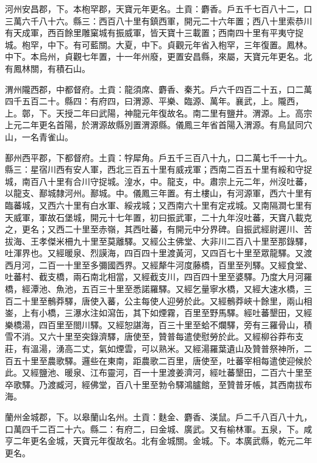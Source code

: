 \begin{pinyinscope}
 河州安昌郡，下。本枹罕郡，天寶元年更名。土貢：麝香。戶五千七百八十二，口三萬六千八十六。縣三：西百八十里有鎮西軍，開元二十六年置；西八十里索恭川有天成軍，西百餘里雕窠城有振威軍，皆天寶十三載置；西南四十里有平夷守捉城。枹罕，中下。有可藍關。大夏，中下。貞觀元年省入枹罕，三年復置。鳳林。中下。本烏州，貞觀七年置，十一年州廢，更置安昌縣，來屬，天寶元年更名。北有鳳林關，有積石山。



 渭州隴西郡，中都督府。土貢：龍須席、麝香、秦艽。戶六千四百二十五，口二萬四千五百二十。縣四：有府四，曰渭源、平樂、臨源、萬年。襄武，上。隴西，上。鄣，下。天授二年曰武陽，神龍元年復故名。南二里有鹽井。渭源。上。高宗上元二年更名首陽，於渭源故縣別置渭源縣。儀鳳三年省首陽入渭源。有鳥鼠同穴山，一名青雀山。



 鄯州西平郡，下都督府。土貢：牸犀角。戶五千三百八十九，口二萬七千一十九。縣三：星宿川西有安人軍，西北三百五十里有威戎軍；西南二百五十里有綏和守捉城，南百八十里有合川守捉城。湟水，中。龍支，中。肅宗上元二年，州沒吐蕃，以龍支、鄯城隸河州。鄯城。中。儀鳳三年置。有土樓山，有河源軍，西六十里有臨蕃城，又西六十里有白水軍、綏戎城；又西南六十里有定戎城。又南隔澗七里有天威軍，軍故石堡城，開元十七年置，初曰振武軍，二十九年沒吐蕃，天寶八載克之，更名；又西二十里至赤嶺，其西吐蕃，有開元中分界碑。自振武經尉遲川、苦拔海、王孝傑米柵九十里至莫離驛。又經公主佛堂、大非川二百八十里至那錄驛，吐渾界也。又經暖泉、烈謨海，四百四十里渡黃河，又四百七十里至眾龍驛。又渡西月河，二百一十里至多彌國西界。又經犛牛河度藤橋，百里至列驛。又經食堂、吐蕃村、截支橋，兩石南北相當，又經截支川，四百四十里至婆驛。乃度大月河羅橋，經潭池、魚池，五百三十里至悉諾羅驛。又經乞量寧水橋，又經大速水橋，三百二十里至鶻莽驛，唐使入蕃，公主每使人迎勞於此。又經鶻莽峽十餘里，兩山相崟，上有小橋，三瀑水注如瀉缶，其下如煙霧，百里至野馬驛。經吐蕃墾田，又經樂橋湯，四百里至閤川驛。又經恕諶海，百三十里至蛤不爛驛，旁有三羅骨山，積雪不消。又六十里至突錄濟驛，唐使至，贊普每遣使慰勞於此。又經柳谷莽布支莊，有溫湯，湧高二丈，氣如煙雲，可以熟米。又經湯羅葉遺山及贊普祭神所，二百五十里至農歌驛。邏些在東南，距農歌二百里，唐使至，吐蕃宰相每遣使迎候於此。又經鹽池、暖泉、江布靈河，百一十里渡姜濟河，經吐蕃墾田，二百六十里至卒歌驛。乃渡臧河，經佛堂，百八十里至勃令驛鴻臚館，至贊普牙帳，其西南拔布海。



 蘭州金城郡，下。以皋蘭山名州。土貢：麩金、麝香、渼鼠。戶二千八百八十九，口萬四千二百二十六。縣二：有府二，曰金城、廣武。又有榆林軍。五泉，下。咸亨二年更名金城，天寶元年復故名。北有金城關。金城。下。本廣武縣，乾元二年更名。




\end{pinyinscope}
